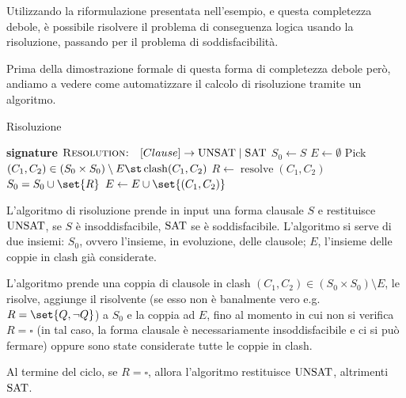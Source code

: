 Utilizzando la riformulazione presentata nell'esempio, e questa completezza debole, è possibile risolvere il problema di conseguenza logica usando la risoluzione, passando per il problema di soddisfacibilità.

Prima della dimostrazione formale di questa forma di completezza debole però, andiamo a vedere come automatizzare il calcolo di risoluzione tramite un algoritmo.

\begin{algorithmdesc}{Risoluzione}
    \begin{algorithmic}[1]
      \Statex{} \textbf{signature} \(\textsc{Resolution:} \quad [Clause] \to \Unsat \mid \Sat\)
          \State{} \(S_0\gets S\)
          \State{} \(E \gets \emptyset\)
          \Repeat{}
            \State{} Pick \((C_1, C_2) \in (S_0 \times S_0)\setminus E \st \operatorname{clash}(C_1, C_2)\)
            \State{} \(R \gets \operatorname{resolve}(C_1, C_2)\)
              \State{} \(S_0 = S_0 \cup \set{R}\)
            \EndIf{}
            \State{} \(E \gets E \cup \set{(C_1, C_2)}\)
            \State{} \Return{\(\Unsat\)}
          \Else{}
            \State{} \Return{\(\Sat\)}
          \EndIf{}
      \EndFunction{}
    \end{algorithmic}
\end{algorithmdesc}

L'algoritmo di risoluzione prende in input una forma clausale \(S\) e restituisce \(\Unsat\), se \(S\) è insoddisfacibile, \(\Sat\) se è soddisfacibile.
L'algoritmo si serve di due insiemi: \(S_0\), ovvero l'insieme, in evoluzione, delle clausole; \(E\), l'insieme delle coppie in clash già considerate. 

L'algoritmo prende una coppia di clausole in clash \((C_1,C_2)\in (S_0 \times S_0)\setminus E\), le risolve, aggiunge il risolvente (se esso non è banalmente vero e.g. \(R=\set{Q, \neg Q}\)) a \(S_0\) e la coppia ad \(E\), fino al momento in cui non si verifica \(R=\square\) (in tal caso, la forma clausale è necessariamente insoddisfacibile e ci si può fermare) oppure sono state considerate tutte le coppie in clash. 

Al termine del ciclo, se \(R=\square\), allora l'algoritmo restituisce \(\Unsat\), altrimenti \(\Sat\).

